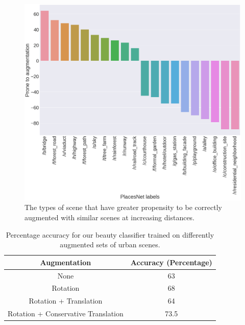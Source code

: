 \begin{figure}[t!]
    \centering
    \includegraphics[width=\columnwidth]{SimilarityPlacesPrevalence.png}
    \caption{The types of scene that have greater propensity to be correctly augmented with similar scenes at increasing distances.}
    \label{fig:augmentationSimilarity}
\end{figure}




\begin{table}[t!]
    \centering
    \begin{tabular}{|c|c|}
        \hline
        \textbf{Augmentation} & \textbf{Accuracy (Percentage)}\\
        \hline
        None & 63 \\
        \hline
        Rotation  & 68 \\
        \hline
        Rotation + Translation  & 64 \\
        \hline
        Rotation + Conservative Translation & 73.5 \\
        \hline
    \end{tabular}
    \caption{Percentage accuracy for our beauty classifier trained on differently augmented sets of  urban scenes.}
    \label{tab:classifier}
    \vspace{-10mm}
\end{table}


